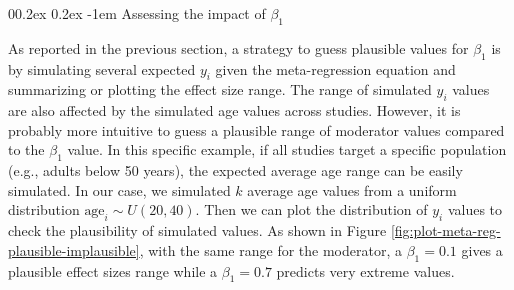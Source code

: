 \documentclass[
  man,floatsintext]{apa6}
\makeatletter
\let\oldparagraph\paragraph
\renewcommand{\paragraph}[1]{\oldparagraph{#1}\mbox{}}
\renewcommand{\paragraph}{\@startsection{paragraph}{4}{\parindent}%
  {0\baselineskip \@plus 0.2ex \@minus 0.2ex}%
  {-1em}%
  {\normalfont\normalsize\bfseries\itshape\typesectitle}}
\makeatother
\begin{document}
\paragraph{\texorpdfstring{Assessing the impact of \(\beta_1\)}{Assessing the impact of \textbackslash beta\_1}}\label{assessing-the-impact-of-beta_1}

As reported in the previous section, a strategy to guess plausible values for \(\beta_{1}\) is by simulating several expected \(y_{i}\) given the meta-regression equation and summarizing or plotting the effect size range. The range of simulated \(y_{i}\) values are also affected by the simulated age values across studies. However, it is probably more intuitive to guess a plausible range of moderator values compared to the \(\beta_{1}\) value. In this specific example, if all studies target a specific population (e.g., adults below 50 years), the expected average age range can be easily simulated. In our case, we simulated \(k\) average age values from a uniform distribution \(\text{age}_{i} \sim U\left( 20,40 \right)\). Then we can plot the distribution of \(y_{i}\) values to check the plausibility of simulated values. As shown in Figure \ref{fig:plot-meta-reg-plausible-implausible}, with the same range for the moderator, a \(\beta_{1} = 0.1\) gives a plausible effect sizes range while a \(\beta_{1} = 0.7\) predicts very extreme values.

\scriptsize
\end{document}
